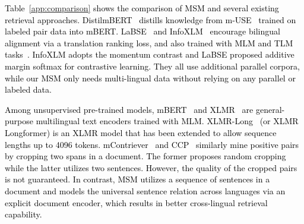 \textcolor{black}{
Table~\ref{app:comparison} shows the comparison of MSM and several existing retrieval approaches. DistilmBERT~\citep{reimers-gurevych-2020-making} distills knowledge from m-USE~\citep{yang2019multilingual} trained on labeled pair data into mBERT. LaBSE~\citep{feng-etal-2022-language} and InfoXLM~\citep{chi-etal-2021-infoxlm} encourage bilingual alignment via a translation ranking loss, and also trained with MLM and TLM tasks~\citep{lample2019cross}. InfoXLM adopts the momentum contrast and LaBSE proposed additive margin softmax for contrastive learning. They all use additional parallel corpora, while our MSM only needs multi-lingual data without relying on any parallel or labeled data.
}

\textcolor{black}{
Among unsupervised pre-trained models, mBERT~\citep{bert2019} and XLMR~\citep{conneau2019unsupervised} are general-purpose multilingual text encoders trained with MLM. XLMR-Long~\citep{Sagen1545786} (or XLMR Longformer) is an XLMR model that has been extended to allow sequence lengths up to 4096 tokens. mContriever~\citep{izacard2021unsupervised} and CCP~\citep{wu2022unsupervised} similarly mine positive pairs by cropping two spans in a document. The former proposes random cropping while the latter utilizes two sentences. However, the quality of the cropped pairs is not guaranteed. In contrast, MSM utilizes a sequence of sentences in a document and models the universal sentence relation across languages via an explicit document encoder, which results in better cross-lingual retrieval capability.
}


